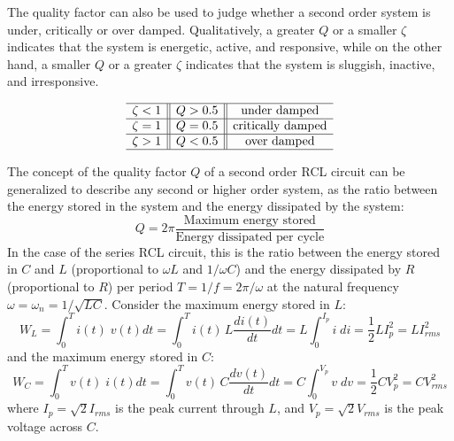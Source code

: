 \documentclass{article}
\begin{document}
The quality factor can also be used to judge whether a second order system 
is under, critically or over damped. Qualitatively, a greater $Q$ or a smaller
$\zeta$ indicates that the system is energetic, active, and responsive, while 
on the other hand, a smaller $Q$ or a greater $\zeta$ indicates that the
system is sluggish, inactive, and irresponsive. 

\begin{equation}
  \begin{array}{c||c||c} \hline 
    \zeta<1 & Q>0.5 & \mbox{under damped} \\\hline
    \zeta=1 & Q=0.5 & \mbox{critically damped} \\\hline
    \zeta>1 & Q<0.5 & \mbox{over damped} \\ \hline
  \end{array}
\end{equation}

The concept of the quality factor $Q$ of a second order RCL circuit 
can be generalized to describe any second or higher order system, 
as the ratio between the energy stored in the system and the energy 
dissipated by the system:
\begin{equation}
  Q=2\pi\frac{\mbox{Maximum energy stored}}{\mbox{Energy dissipated per cycle}}
\end{equation}
In the case of the series RCL circuit, this is the ratio between 
the energy stored in $C$ and $L$ (proportional to $\omega L$ and 
$1/\omega C$) and the energy dissipated by $R$ (proportional to
$R$) per period $T=1/f=2\pi/\omega$ at the natural frequency 
$\omega=\omega_n=1/\sqrt{LC}$. Consider the maximum energy stored
in $L$:
\begin{equation}	
  W_L=\int_0^T i(t)\; v(t) dt=\int_0^T i(t) \,L \frac{di(t)}{dt} dt
  =L \int_0^{I_p} i \;di=\frac{1}{2}LI_p^2=LI^2_{rms}	
\end{equation}
and the maximum energy stored in $C$:
\begin{equation}
  W_C=\int_0^T v(t)\; i(t) dt=\int_0^T v(t) \,C \frac{dv(t)}{dt} dt
  =C \int_0^{V_p} v \;dv=\frac{1}{2}CV_p^2=CV^2_{rms}	
\end{equation}
where $I_p=\sqrt{2}I_{rms}$ is the peak current through $L$, and
$V_p=\sqrt{2}V_{rms}$ is the peak voltage across $C$. 
\end{document}
